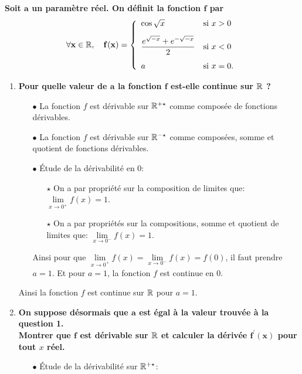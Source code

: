 \documentclass[a4paper, 11pt,reqno]{article}
\begin{document}
\begin{correction} \;
	\textbf{Soit $\mathbf{a}$ un param\`etre r\'eel. On d\'efinit la fonction $\mathbf{f}$ par}
	$$\mathbf{\forall x\in\R,\quad f(x)=\left\lbrace\begin{array}{ll} \cos{\sqrt{x}}                           & \hbox{si}\ x>0\vsec  \\
             \ddp\frac{e^{\sqrt{-x}}+e^{-\sqrt{-x}}   }{2} & \hbox{si}\  x<0\vsec \\ a & \hbox{si}\ x=0.\end{array}\right.}$$
	\begin{enumerate}
		\item \textbf{Pour quelle valeur de $\mathbf{a}$ la fonction $\mathbf{f}$ est-elle continue sur $\mathbf{\mathbb{R}}$ ?}
		      \begin{itemize}
			      \item[$\bullet$] La fonction $f$ est d\'erivable sur $\mathbb{R}^{+\star}$ comme compos\'ee de fonctions d\'erivables.
			      \item[$\bullet$] La fonction $f$ est d\'erivable sur $\mathbb{R}^{-\star}$ comme compos\'ees, somme et quotient de fonctions d\'erivables.
			      \item[$\bullet$] \'Etude de la d\'erivabilit\'e en 0:
			            \begin{itemize}
				            \item[$\star$] On a par propri\'et\'e sur la composition de limites que: $\lim\limits_{x\to 0^+} f(x)=1$.
				            \item[$\star$] On a par propri\'et\'es sur la compositions, somme et quotient de limites que: $\lim\limits_{x\to 0^-} f(x)=1$.
			            \end{itemize}
			            Ainsi pour que $\lim\limits_{x\to 0^+} f(x)=\lim\limits_{x\to 0^-} f(x)=f(0)$, il faut prendre $a=1$. Et pour $a=1$, la fonction $f$ est continue en 0.
		      \end{itemize}
		      Ainsi la fonction $f$ est continue sur $\mathbb{R}$ pour $a=1$.
		\item \textbf{On suppose d\'esormais que $\mathbf{a}$ est \'egal \`a la valeur trouv\'ee \`a la question 1.\\
			      \noindent Montrer que $\mathbf{f}$ est d\'erivable sur $\mathbf{\mathbb{R}}$ et calculer la d\'eriv\'ee $\mathbf{f^{\prime}(x)}$ pour tout $x$ r\'eel. }
		      \begin{itemize}
			      \item[$\bullet$] \'Etude de la d\'erivabilit\'e sur $\mathbb{R}^{+\star}$:\\

\end{itemize}
\end{enumerate}
\end{correction}
\end{document}
